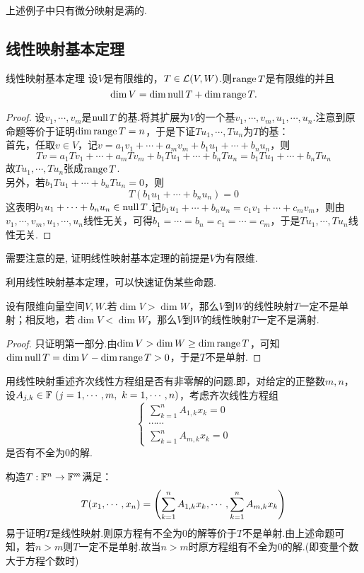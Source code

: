 上述例子中只有微分映射是满的.

\subsection{线性映射基本定理}

\begin{proposition}{线性映射基本定理}
	设$V$是有限维的，$T \in \mathcal{L} (V,W)$.则$\operatorname{range} T$是有限维的并且$$\dim V = \dim \operatorname{null} T + \dim \operatorname{range} T.$$
\end{proposition}
\begin{proof}
	设$v_1, \cdots ,v_m$是$\operatorname{null} T$的基.将其扩展为$V$的一个基$v_1, \cdots ,v_m ,u_1, \cdots ,u_n$.注意到原命题等价于证明$\dim \operatorname{range} T = n$，于是下证$Tu_1, \cdots ,Tu_n$为$T$的基： \\
	首先，任取$v \in V$，记$v=a_1v_1 + \cdots + a_mv_m + b_1u_1 + \cdots + b_nu_n$，则$$Tv = a_1Tv_1 + \cdots + a_mTv_m + b_1Tu_1 + \cdots + b_nTu_n = b_1Tu_1 + \cdots + b_nTu_n$$
	故$Tu_1, \cdots ,Tu_n$张成$\operatorname{range} T$. \\
	另外，若$b_1Tu_1 + \cdots + b_nTu_n=0$，则$$T(b_1u_1 + \cdots + b_nu_n)=0$$
	这表明$b_1u_1 + \cdots + b_nu_n \in \operatorname{null} T$.记$b_1u_1 + \cdots + b_nu_n = c_1v_1 + \cdots + c_mv_m$，则由$v_1, \cdots ,v_m,u_1, \cdots ,u_n$线性无关，可得$b_1= \cdots = b_n = c_1 = \cdots = c_m$，于是$Tu_1, \cdots ,Tu_n$线性无关.
\end{proof}
\begin{remark}
	需要注意的是, 证明线性映射基本定理的前提是$V$为有限维.
\end{remark}

利用线性映射基本定理，可以快速证伪某些命题.

\begin{proposition}{}
	设有限维向量空间$V,W$.若$\dim V > \dim W$，那么$V$到$W$的线性映射$T$一定不是单射；相反地，若$\dim V < \dim W$，那么$V$到$W$的线性映射$T$一定不是满射.
\end{proposition}
\begin{proof}
	只证明第一部分.由$\dim V > \dim W \geq \dim \operatorname{range} T$，可知$\dim \operatorname{null} T = \dim V - \dim \operatorname{range} T > 0$，于是$T$不是单射.
\end{proof}

\begin{example}
	用线性映射重述齐次线性方程组是否有非零解的问题.即，对给定的正整数$m,n$，设$A_{j,k} \in \mathbb{F} ~(j=1,\cdots ,m,~k=1,\cdots ,n)$，考虑齐次线性方程组$$\begin{cases}
		\sum_{k=1}^{n} A_{1,k}x_k = 0 \\
		\cdots \cdots \\
		\sum_{k=1}^{n} A_{m,k}x_k = 0
	\end{cases}$$是否有不全为$0$的解.
\end{example}
\begin{solution}
	构造$T:\mathbb{F} ^n \to \mathbb{F} ^m$满足：$$T(x_1, \cdots ,x_n) = \left( \sum_{k=1}^{n} A_{1,k}x_k, \cdots , \sum_{k=1}^{n} A_{m,k}x_k \right)$$
	易于证明$T$是线性映射.则原方程有不全为$0$的解等价于$T$不是单射.由上述命题可知，若$n>m$则$T$一定不是单射.故当$n > m$时原方程组有不全为$0$的解.(即变量个数大于方程个数时)
\end{solution}

